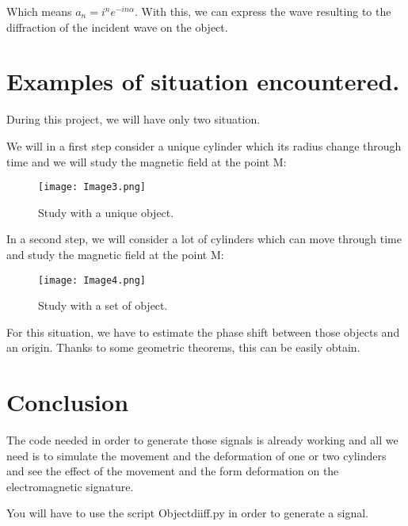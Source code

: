 Which means $a_n = i^n e^{-i n \alpha} $. With this, we can express the wave resulting to the diffraction of the incident wave on the object.

\chapter{Examples of situation encountered.}

During this project, we will have only two situation.

We will in a first step consider a unique  cylinder which its radius change through time and we will study the magnetic field at the point M:

\begin{figure}[H]
\centering
    \texttt{[image: Image3.png]}
    \caption{Study with a unique object.}
    \label{fig:Image3}
\end{figure}

In a second step, we will consider a lot of cylinders which can move through time and study the magnetic field at the point M: 

\begin{figure}[H]
\centering
    \texttt{[image: Image4.png]}
    \caption{Study with a set of object.}
    \label{fig:Image4}
\end{figure}

For this situation, we have to estimate the phase shift between those objects and an origin. Thanks to some geometric theorems, this can be easily obtain. 


\bigskip

\chapter*{Conclusion}
The code needed in order to generate those signals is already working and all we need is to simulate the movement and the deformation of one or two cylinders and see the effect of the movement and the form deformation on the electromagnetic signature.

You will have to use the script Objectdiiff.py in order to generate a signal.